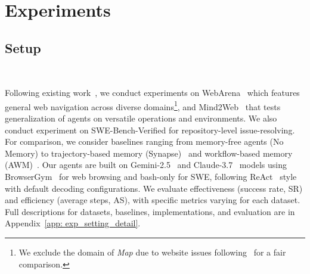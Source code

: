 \section{Experiments}


\subsection{Setup}~\label{sec: exp_setup}
\vspace{-5mm}

Following existing work~\citep{wang2025agent}, we conduct experiments on WebArena~\citep{zhou2024webarena} which features general web navigation across diverse domains\footnote{We exclude the domain of \textit{Map} due to website issues following~\cite{miyai2025webchorearena} for a fair comparison.}, and Mind2Web~\citep{deng2023mind2web} that tests generalization of agents on versatile operations and environments. We also conduct experiment on SWE-Bench-Verified for repository-level issue-resolving.
For comparison, we consider baselines ranging from memory-free agents (No Memory) to trajectory-based memory (Synapse)~\citep{zheng2024synapse} and workflow-based memory (AWM)~\citep{wang2025agent}.
Our agents are built on Gemini-2.5~\citep{comanici2025gemini} and Claude-3.7~\citep{Anthropic} models using BrowserGym~\citep{chezelles2025browsergym} for web browsing and bash-only for SWE, following ReAct~\citep{yao2023react} style with default decoding configurations.
We evaluate effectiveness (success rate, SR) and efficiency (average steps, AS), with specific metrics varying for each dataset. 
Full descriptions for datasets, baselines, implementations, and evaluation are in Appendix~\ref{app: exp_setting_detail}.

